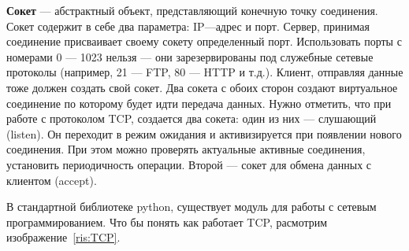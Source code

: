 \documentclass[a4paper]{article}
\begin{document}
\begin{figure}[h]
\end{figure}

\textbf{Сокет} --- абстрактный объект, представляющий конечную точку соединения. Сокет содержит в себе два параметра: IP---адрес и порт. Сервер, принимая соединение присваивает своему сокету определенный порт. Использовать порты с номерами 0 --- 1023 нельзя --- они зарезервированы под служебные сетевые протоколы (например, 21 --- FTP, 80 --- HTTP и т.д.). Клиент, отправляя данные тоже должен создать свой сокет. Два сокета с обоих сторон создают виртуальное соединение по которому будет идти передача данных. Нужно отметить, что при работе с протоколом TCP, создается два сокета: один из них — слушающий (listen). Он переходит в режим ожидания и активизируется при появлении нового соединения. При этом можно проверять актуальные активные соединения, установить периодичность операции. Второй — сокет для обмена данных с клиентом (accept).

В стандартной библиотеке python, существует модуль для работы с сетевым программированием. Что бы понять как работает TCP, расмотрим изображение~\ref{ris:TCP}.
\end{document}
